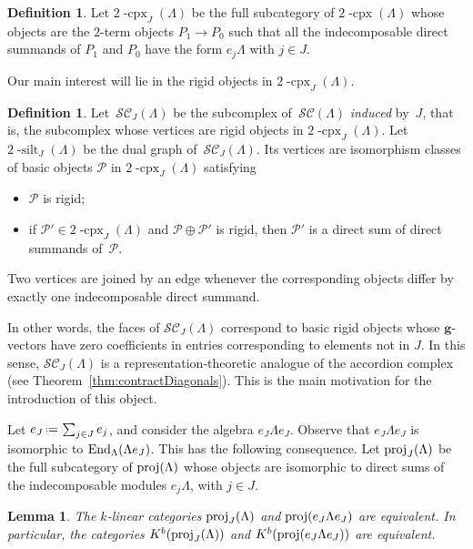\documentclass{amsart}
\newtheorem{lemma}[theorem]{Lemma}
\theoremstyle{definition}
\newtheorem{definition}[theorem]{Definition}
\renewcommand{\b}[1]{\mathbf{#1}} %
\newcommand{\eqdef}{\mbox{\,\raisebox{0.2ex}{\scriptsize\ensuremath{\mathrm:}}\ensuremath{=}\,}} %
\newcommand{\darkblue}{\color{darkblue}} %
\newcommand{\defn}[1]{\textsl{\darkblue #1}} %
\newcommand{\complexP}{\mathcal{P}} %
\newcommand{\cpx}{2 \! \operatorname{-cpx}}
\newcommand{\silt}{2 \! \operatorname{-silt}}
\newcommand{\siltingComplex}{\mathcal{SC}}
\newcommand{\proj}{\operatorname{{\rm proj }}}
\newcommand{\End}[1]{\operatorname{\rm End}_{#1}}
\begin{document}
\begin{definition}
Let $\cpx_J(\Lambda)$ be the full subcategory of $\cpx(\Lambda)$ whose objects are the $2$-term objects $P_1\to P_0$ such that all the indecomposable direct summands of $P_1$ and $P_0$ have the form $e_j \Lambda$ with $j\in J$.
\end{definition}

Our main interest will lie in the rigid objects in $\cpx_J(\Lambda)$.

\begin{definition}
Let~$\siltingComplex_J(\Lambda)$ be the subcomplex of~$\siltingComplex(\Lambda)$ \defn{induced} by~$J$, that is, the subcomplex whose vertices are rigid objects in $\cpx_J(\Lambda)$.
Let $\silt_J(\Lambda)$ be the dual graph of~$\siltingComplex_J(\Lambda)$.
Its vertices are isomorphism classes of basic objects $\complexP$ in $\cpx_J(\Lambda)$ satisfying
\begin{itemize}
\item $\complexP$ is rigid;
\item if $\complexP'\in \cpx_J(\Lambda)$ and $\complexP\oplus \complexP'$ is rigid, then $\complexP'$ is a direct sum of direct summands of~$\complexP$.
\end{itemize}
Two vertices are joined by an edge whenever the corresponding objects differ by exactly one indecomposable direct summand.
\end{definition}

In other words, the faces of $\siltingComplex_J(\Lambda)$ correspond to basic rigid objects whose $\b{g}$-vectors have zero coefficients in entries corresponding to elements not in $J$.
In this sense, $\siltingComplex_J(\Lambda)$ is a representation-theoretic analogue of the accordion complex~\cite{Chapoton-quadrangulations, GarverMcConville, MannevillePilaud-accordion} (see Theorem~\ref{thm:contractDiagonals}).
This is the main motivation for the introduction of this object.

Let $e_J \eqdef \sum_{j\in J} e_j$, and consider the algebra $e_J \Lambda e_J$.  
Observe that $e_J \Lambda e_J$ is isomorphic to $\End{\Lambda}(\Lambda e_J)$.  This has the following consequence.
Let $\proj_J(\Lambda)$ be the full subcategory of $\proj(\Lambda)$ whose objects are isomorphic to direct sums of
the indecomposable modules $e_j \Lambda$, with $j\in J$.

\begin{lemma}
 The $k$-linear categories $\proj_J(\Lambda)$ and $\proj(e_J\Lambda e_J)$ are equivalent.
 In particular, the categories $K^b(\proj_J(\Lambda))$ and $K^b(\proj(e_J \Lambda e_J))$ are equivalent.
\end{lemma}
\end{document}
